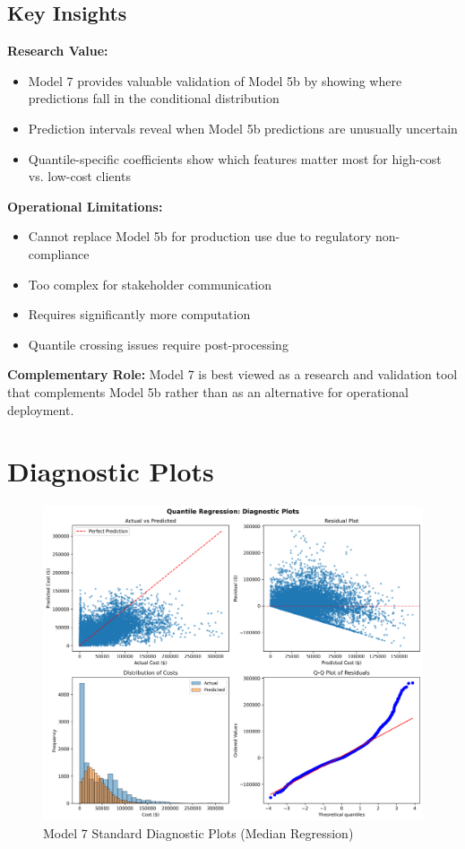 \subsection{Key Insights}

\textbf{Research Value:}
\begin{itemize}
\item Model 7 provides valuable validation of Model 5b by showing where predictions fall in the conditional distribution
\item Prediction intervals reveal when Model 5b predictions are unusually uncertain
\item Quantile-specific coefficients show which features matter most for high-cost vs. low-cost clients
\end{itemize}

\textbf{Operational Limitations:}
\begin{itemize}
\item Cannot replace Model 5b for production use due to regulatory non-compliance
\item Too complex for stakeholder communication
\item Requires significantly more computation
\item Quantile crossing issues require post-processing
\end{itemize}

\textbf{Complementary Role:}
Model 7 is best viewed as a research and validation tool that complements Model 5b rather than as an alternative for operational deployment.

\section{Diagnostic Plots}

\begin{figure}[H]
\centering
\includegraphics[width=\textwidth]{models/model_7/diagnostic_plots.png}
\caption{Model 7 Standard Diagnostic Plots (Median Regression)}
\label{fig:model7_diagnostics}
\end{figure}

